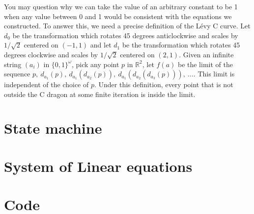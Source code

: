 \documentclass{article}
\newcommand{\bounding}{
\draw[tsty] (-2.5,1) -- (-1.5,0) -- (2.5,0) -- (3.5,1) -- (3.5,2.5) -- (2,4) -- (-1,4) -- (-2.5, 2.5) -- cycle;
}
\newcommand{\subt}[2]{
    \begin{scope}[yshift=1cm,rotate=45,scale=0.7071]
        #1
    \end{scope}
    \begin{scope}[xshift=0.5cm,yshift=1.5cm,rotate=-45,scale=0.7071]
        #2
    \end{scope}
}
\newcommand{\dup}[1]{\subt{#1}{#1}}
\newcommand{\gtree}[3]{
	#2
	\ifthenelse{#1<2}{
		#3
	}{
		\dup{\gtree{\the\numexpr#1-1}{#2}{#3}}
	}
}
\newcommand{\tree}[1]{
	\gtree{#1}{\fill[tsty] (0,0) -- (1,0) -- (1,1) -- (0,1) -- cycle;}{}
}
\newcommand{\outertree}[1]{
	\gtree{#1}{
		\fill[tsty] (0,0) -- (1,0) -- (1,1) -- (0,1) -- cycle;
	}{\bounding}
}
\newcommand{\depth}{5}%
\begin{document}
You may question why we can take the value of an arbitrary constant to be 1 when any value between 0 and 1 would be consistent with the equations we constructed. To answer this, we need a precise definition of the Lévy C curve. Let $d_0$ be the transformation which rotates 45 degrees anticlockwise and scales by $1/\sqrt{2}$ centered on $(-1,1)$
and let $d_1$ be the transformation which rotates 45 degrees clockwise and scales by $1/\sqrt{2}$ centered on $(2,1)$. Given an infinite string $(a_i)$ in $\{0,1\}^\omega$, pick any point $p$ in $\mathbb{R}^2$, let $f(a)$ be the limit of the sequence $p,\ d_{a_1}(p),\ d_{a_1}(d_{a_2}(p)),\ d_{a_1}(d_{a_2}(d_{a_3}(p))),\ \dots$. This limit is independent of the choice of $p$. Under this definition, every point that is not outside the C dragon at some finite iteration is inside the limit. 

\appendix
\section{State machine}
\section{System of Linear equations}
\section{Code}



\end{document}
